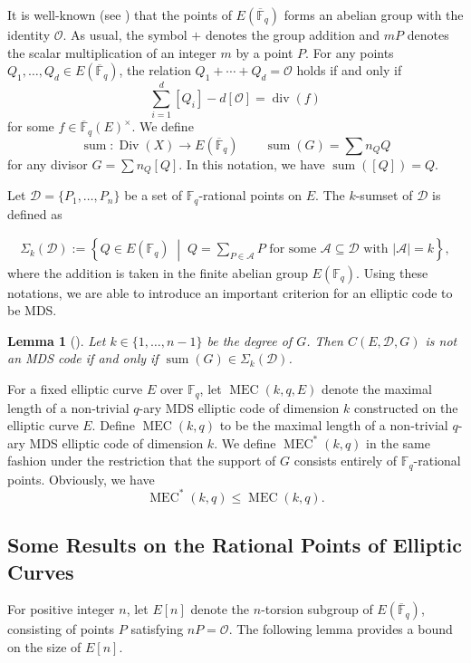 \documentclass[journal,12pt,onecolumn]{IEEEtran}
\newtheorem{lemma}[theorem]{Lemma}
\newcommand{\Point}{\operatorname{sum}}
\newcommand{\sumset}{\Sigma}
\begin{document}
It is well-known (see \cite[Ch. III, Proposition 3.4]{MR2514094}) that the points of $E(\overline{\mathbb{F}}_q)$ forms an abelian group with the identity $\mathcal{O}$. As usual, the symbol $+$ denotes the group addition and $mP$ denotes the scalar multiplication of an integer $m$ by a point $P$. 
For any points $Q_1, \ldots, Q_d \in E(\overline{\mathbb{F}}_q)$, the relation $Q_1 + \cdots + Q_d = \mathcal{O}$ holds if and only if
\[
\sum_{i=1}^d [Q_i] - d[\mathcal{O}] = \operatorname{div}(f)
\]
for some $f \in \overline{\mathbb{F}}_q(E)^{\times}$.  We define
\[
\Point: \operatorname{Div}(X)\to E(\overline{\mathbb{F}}_q) \qquad  \Point(G) = \sum n_Q Q
\]
for any divisor $G = \sum n_Q [Q]$.
In this notation, we have $
\Point([Q]) = Q$.


Let $\mathcal{D} = \{P_1, \ldots, P_n\}$ be a set of $\mathbb{F}_q$-rational points on $E$. The $k$-sumset of $\mathcal{D}$ is defined as

\begin{align}\label{def:k-sumset}
    \sumset_k(\mathcal{D}) := \left\{ Q \in E(\mathbb{F}_q) \; \middle| \; Q = \sum_{P \in \mathcal{A}} P \text{ for some } \mathcal{A} \subseteq \mathcal{D} \text{ with } |\mathcal{A}| = k \right\},
\end{align}
where the addition is taken in the finite abelian group $E(\mathbb{F}_q)$. Using these notations, we are able to introduce an important criterion for an elliptic code to be MDS.
\begin{lemma}[{\cite[Proposition 4.1]{7282884}}]\label{lem:MDS_condition}
Let $ k  \in \{ 1, \ldots, n-1\} $ be the degree of $G$.  Then $C(E, \mathcal{D}, G)$ is not an MDS code if and only if $\Point(G) \in \sumset_k(\mathcal{D})$.
\end{lemma}
For a fixed elliptic curve $E$ over $\mathbb{F}_q$, let $\operatorname{MEC}(k, q, E)$ denote the maximal length of a non‑trivial $q$-ary MDS elliptic code of dimension $k$ constructed on the elliptic curve $E$. 
Define $\operatorname{MEC}(k,q)$ to be the maximal length of a non‑trivial $q$-ary MDS elliptic code of dimension $k$. We define $\operatorname{MEC}^*(k,q)$ in the same fashion under the restriction that the support of $G$ consists entirely of $\mathbb{F}_q$-rational points. 
Obviously, we have 
\[
\operatorname{MEC}^*(k,q) \le \operatorname{MEC}(k,q).
\]


\subsection{Some Results on the Rational Points of Elliptic Curves}
For positive integer $n$, let $E[n]$ denote the $n$-torsion subgroup of $E(\overline{\mathbb{F}}_q)$, consisting of points $P$ satisfying $nP = \mathcal{O}$. The following lemma provides a bound on the size of $E[n]$.
\end{document}
